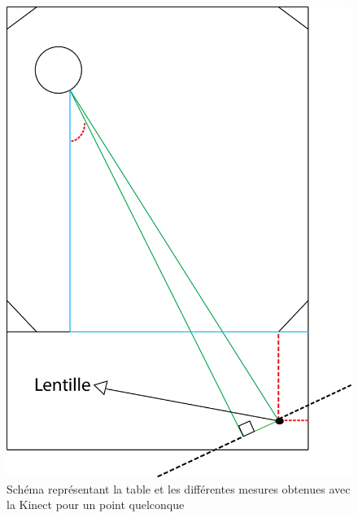 \begin{figure}[htbp]
\centering
\includegraphics[scale=0.5]{fig/kinect_distance.png}
\caption{Schéma représentant la table et les différentes mesures obtenues avec la Kinect pour un point quelconque}
\label{fig:kinect_distance}
\end{figure}

